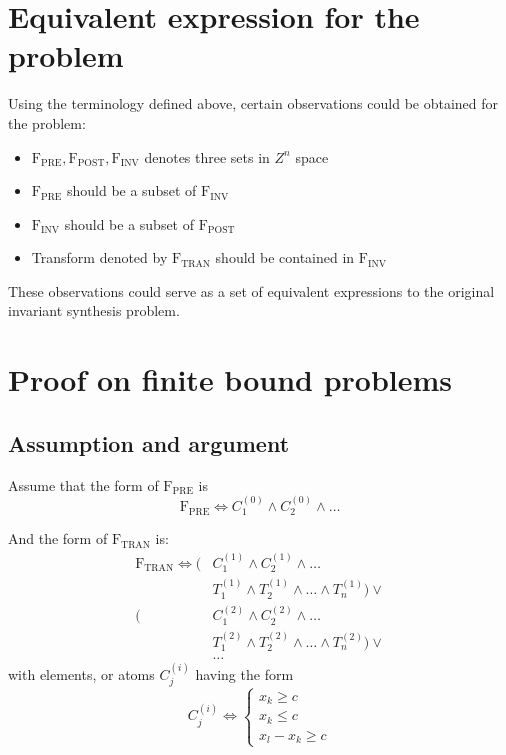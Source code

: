 \documentclass[letterpaper,]{article}
\providecommand{\tightlist}{%
  \setlength{\itemsep}{0pt}\setlength{\parskip}{0pt}}
\begin{document}
\hypertarget{equivalent-expression-for-the-problem}{%
\section{Equivalent expression for the
problem}\label{equivalent-expression-for-the-problem}}

Using the terminology defined above, certain observations could be
obtained for the problem:

\begin{itemize}
\tightlist
\item
  \(\mathrm{F_{PRE}}, \mathrm{F_{POST}}, \mathrm{F_{INV}}\) denotes
  three sets in \(Z^n\) space
\item
  \(\mathrm{F_{PRE}}\) should be a subset of \(\mathrm{F_{INV}}\)
\item
  \(\mathrm{F_{INV}}\) should be a subset of \(\mathrm{F_{POST}}\)
\item
  Transform denoted by \(\mathrm{F_{TRAN}}\) should be contained in
  \(\mathrm{F_{INV}}\)
\end{itemize}

These observations could serve as a set of equivalent expressions to the
original invariant synthesis problem.

\hypertarget{proof-on-finite-bound-problems}{%
\section{Proof on finite bound
problems}\label{proof-on-finite-bound-problems}}

\hypertarget{assumption-and-argument}{%
\subsection{Assumption and argument}\label{assumption-and-argument}}

Assume that the form of \(\mathrm{F_{PRE}}\) is
\[\mathrm{F_{PRE}}\Leftrightarrow C_1^{(0)}\land C_2^{(0)}\land\dots\]

And the form of \(\mathrm{F_{TRAN}}\) is: \[\begin{split}
\mathrm{F_{TRAN}}\Leftrightarrow ( &C_1^{(1)} \land C_2^{(1)} \land \dots
\\ &T^{(1)}_1 \land T^{(1)}_2 \land \dots \land T^{(1)}_n) \lor \\
( &C_1^{(2)} \land C_2^{(2)} \land \dots
\\ &T^{(2)}_1 \land T^{(2)}_2 \land \dots \land T^{(2)}_n) \lor \\
& \dots
\end{split}\] with elements, or atoms \(C_j^{(i)}\) having the form
\[C_j^{(i)} \Leftrightarrow  \begin{cases}x_k \ge c   \\ x_k \le c \\ x_l - x_k \ge c \end{cases}\]
\end{document}
